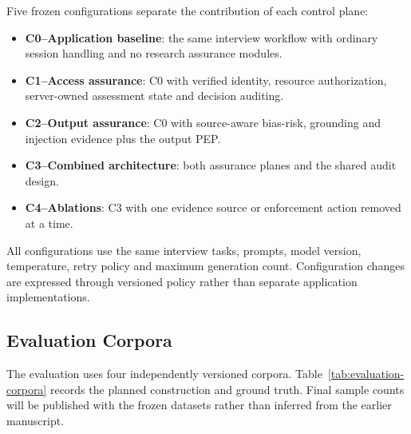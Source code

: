 \documentclass[conference]{IEEEtran}
\begin{document}
Five frozen configurations separate the contribution of each control plane:
\begin{itemize}
\item \textbf{C0--Application baseline}: the same interview workflow with ordinary session handling and no research assurance modules.
\item \textbf{C1--Access assurance}: C0 with verified identity, resource authorization, server-owned assessment state and decision auditing.
\item \textbf{C2--Output assurance}: C0 with source-aware bias-risk, grounding and injection evidence plus the output PEP.
\item \textbf{C3--Combined architecture}: both assurance planes and the shared audit design.
\item \textbf{C4--Ablations}: C3 with one evidence source or enforcement action removed at a time.
\end{itemize}
All configurations use the same interview tasks, prompts, model version, temperature, retry policy and maximum generation count. Configuration changes are expressed through versioned policy rather than separate application implementations.

\subsection{Evaluation Corpora}

The evaluation uses four independently versioned corpora. Table~\ref{tab:evaluation-corpora} records the planned construction and ground truth. Final sample counts will be published with the frozen datasets rather than inferred from the earlier manuscript.
\end{document}
